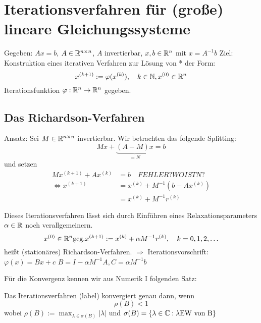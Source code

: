 \chapter[Iterationsverfahren für lineare Gleichungssysteme]{Iterationsverfahren für (große) lineare Gleichungssysteme}
Gegeben: $Ax=b$, $A\in \mathbb{R}^{n\times n}$, $A$ invertierbar, $x,b \in \mathbb{R}^n$ mit $x=A^{-1}b$
Ziel: Konstruktion eines iterativen Verfahren zur Lösung von * der Form:
\begin{equation}
  x^{(k+1)} := \varphi(x^{(k)}),\quad k\in \mathbb{N}, x^{(0)} \in \mathbb{R}^n
  \label{}
\end{equation}
Iterationsfunktion $\varphi: \mathbb{R}^n \to \mathbb{R}^n$ gegeben.

\section{Das Richardson-Verfahren}
Ansatz: Sei $M\in \mathbb{R}^{n\times n}$ invertierbar. Wir betrachten das folgende Splitting:
\begin{equation}
  Mx + \underbrace{(A-M)x}_{=N}= b
  \label{}
\end{equation}
und setzen 
\begin{equation}
  \begin{split}
    Mx^{(k+1)} + Ax^{(k)}     &= b \quad FEHLER? WO IST N?\\
    \Leftrightarrow x^{(k+1)} &= x^{(k)} + M^{-1}(b-Ax^{(k)})\\
    &= x^{(k)} + M^{-1}r^{(k)}
  \end{split}
  \label{}
\end{equation}

Dieses Iterationsverfahren lässt sich durch Einführen eines Relaxationsparameters $\alpha \in \mathbb{R}$ noch verallgemeinern.
\begin{equation}
  x^{(0)} \in \R^n \text{geg.}
  x^{(k+1)} := x^{(k)} + \alpha M^{-1} r^{(k)},\quad k=0,1,2,\dots
  \label{Iterationsverfahren}
\end{equation}
heißt (stationäres) Richardson-Verfahren. 
$\Rightarrow$ Iterationsvorschrift: $\varphi(x) = Bx + c$ $B=I-\alpha M^{-1}A, C=\alpha M^{-1}b$

Für die Konvergenz kennen wir aus Numerik I folgenden Satz:

\begin{satz}
  \label{itkonvergenz}
  Das Iterationsverfahren (label) konvergiert genau dann, wenn 
  \begin{equation}
    \rho (B) < 1 
    \label{}
  \end{equation}
  wobei $\rho(B) := \max_{\lambda \in \sigma(B)} |\lambda|$ und $\sigma(B) = \left\{ \lambda\in \mathbb{C}: \lambda \text{EW von B} \right\}$
\end{satz}

